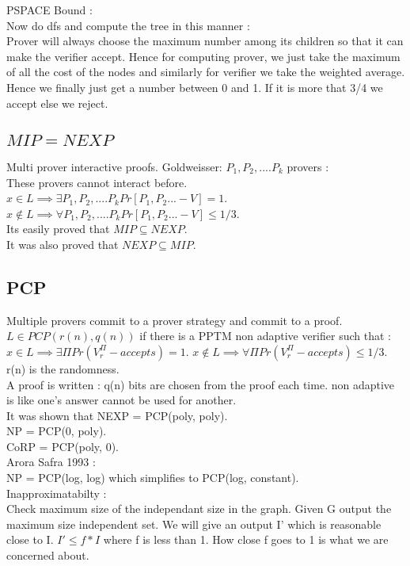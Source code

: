 \documentclass[solution,addpoints,12pt]{exam}
\begin{document}
PSPACE Bound :\\
Now do dfs and compute the tree in this manner :\\
Prover will always choose the maximum number among its
children so that it can make the verifier accept. Hence
for computing prover, we just take the maximum of all the
cost of the nodes and similarly for verifier we take the weighted
average. Hence we finally just get a number between 0 and 1.
If it is more that 3/4 we accept else we reject.\\

\subsection{$MIP = NEXP$}
Multi prover interactive proofs.
Goldweisser: $P_1, P_2, .... P_k$ provers :\\
These provers cannot interact before.
$x \in L \implies \exists P_1, P_2, .... P_k Pr[P_1, P_2...-V] = 1$.\\
$x \not \in L \implies \forall P_1, P_2, .... P_k Pr[P_1, P_2...-V] \le 1/3$.\\
Its easily proved that $MIP \subseteq NEXP$.\\
It was also proved that $NEXP \subseteq MIP$.\\

\subsection{PCP}
Multiple provers commit to a prover strategy and commit to a proof.
$L \in PCP(r(n), q(n))$ if there is a PPTM non adaptive verifier such that :\\
$x \in L \implies \exists \Pi Pr(V_{r}^{\Pi}-accepts) = 1$.
$x \not \in L \implies \forall \Pi Pr(V_{r}^{\Pi}-accepts) \le 1/3$.
r(n) is the randomness.\\
A proof is written : q(n) bits are chosen from the proof each time.
non adaptive is like one's answer cannot be used for another.\\
It was shown that NEXP = PCP(poly, poly).\\
NP = PCP(0, poly).\\
CoRP = PCP(poly, 0).\\
Arora Safra 1993 :\\
NP = PCP(log, log) which simplifies to PCP(log, constant).\\
Inapproximatabilty :\\
Check maximum size of the independant size in the graph.
Given G output the maximum size independent set. We
will give an output I' which is reasonable close to I.
$I' \le f*I$ where f is less than 1. How close
f goes to 1 is what we are concerned about.\\
\end{document}
